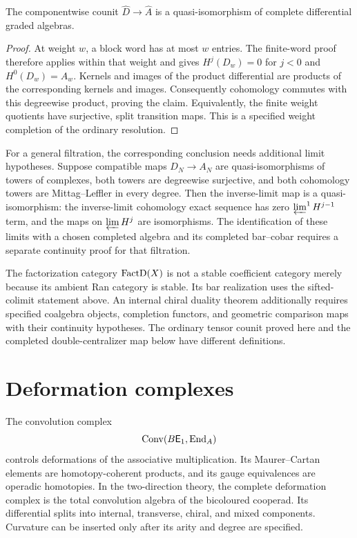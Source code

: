 \begin{theorem}\label{thm:positive-reconstruction}
The componentwise counit $\widehat D\to\widehat A$ is a quasi-isomorphism
of complete differential graded algebras.
\end{theorem}
\begin{proof}
At weight $w$, a block word has at most $w$ entries.
The finite-word proof therefore applies within that weight and gives
$H^j(D_w)=0$ for $j<0$ and $H^0(D_w)=A_w$.
Kernels and images of the product differential are products of the corresponding kernels and images.
Consequently cohomology commutes with this degreewise product, proving the claim.
Equivalently, the finite weight quotients have surjective, split transition maps.
This is a specified weight completion of the ordinary resolution.
\end{proof}

For a general filtration, the corresponding conclusion needs additional limit hypotheses.
Suppose compatible maps $D_N\to A_N$ are quasi-isomorphisms of towers of complexes,
both towers are degreewise surjective, and both cohomology towers are Mittag--Leffler in every degree.
Then the inverse-limit map is a quasi-isomorphism: the inverse-limit cohomology exact sequence has zero
$\varprojlim^1 H^{j-1}$ term, and the maps on $\varprojlim H^j$ are isomorphisms.
The identification of these limits with a chosen completed algebra and its completed bar--cobar
requires a separate continuity proof for that filtration.

The factorization category $\operatorname{FactD}(X)$ is not a stable coefficient category
merely because its ambient Ran category is stable.
Its bar realization uses the sifted-colimit statement above.
An internal chiral duality theorem additionally requires specified coalgebra objects,
completion functors, and geometric comparison maps with their continuity hypotheses.
The ordinary tensor counit proved here and the completed double-centralizer map below have different definitions.

\section{Deformation complexes}
The convolution complex
\[
 \operatorname{Conv}(B\mathsf E_1,\operatorname{End}_A)
\]
controls deformations of the associative multiplication.  Its Maurer--Cartan elements are homotopy-coherent products, and its gauge equivalences are operadic homotopies.  In the two-direction theory, the complete deformation complex is the total convolution algebra of the bicoloured cooperad.  Its differential splits into internal, transverse, chiral, and mixed components.  Curvature can be inserted only after its arity and degree are specified.

